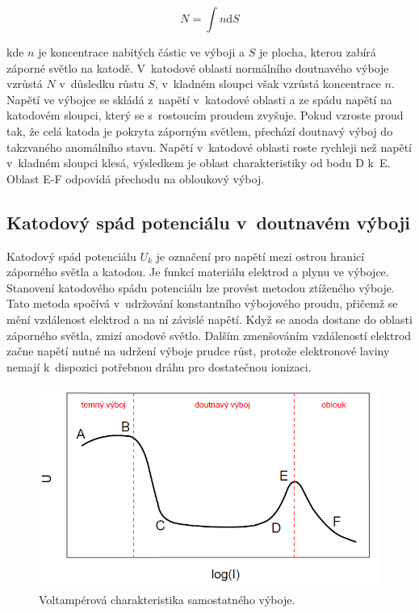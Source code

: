 \documentclass[a4paper,12pt]{article}
\begin{document}
\begin{equation}
	N = \int n \text{d}S
	\label{10}
\end{equation}

kde $n$ je koncentrace nabitých částic ve výboji a $S$ je plocha, kterou zabírá záporné světlo na katodě. V~katodové oblasti normálního doutnavého výboje vzrůstá $N$ v~důsledku růstu $S$, v~kladném sloupci však vzrůstá koncentrace $n$. Napětí ve výbojce se skládá z~napětí v~katodové oblasti a ze spádu napětí na katodovém sloupci, který se s~rostoucím proudem zvyšuje. Pokud vzroste proud tak, že celá katoda je pokryta záporným světlem, přechází doutnavý výboj do takzvaného anomálního stavu. Napětí v~katodové oblasti roste rychleji než napětí v~kladném sloupci klesá, výsledkem je oblast charakteristiky od bodu D k~E. Oblast E-F odpovídá přechodu na obloukový výboj.

\subsection{Katodový spád potenciálu v~doutnavém výboji}
Katodový spád potenciálu $U_k$ je označení pro napětí mezi ostrou hranicí záporného světla a katodou. Je funkcí materiálu elektrod a plynu ve výbojce. Stanovení katodového spádu potenciálu lze provést metodou ztíženého výboje. 
Tato metoda spočívá v~udržování konstantního výbojového proudu, přičemž se mění vzdálenost elektrod a na ní závislé napětí. Když se anoda dostane do oblasti záporného světla, zmizí anodové 
světlo. Dalším zmen\-šo\-vá\-ním vzdáleností elektrod začne napětí nutné na 
udržení výboje prudce růst, protože elektronové laviny nemají k~dispozici 
potřebnou dráhu pro dostatečnou ionizaci.

\begin{figure}[h]
	\centering
	\includegraphics[width=130mm]{VA.png}
	\caption{Voltampérová charakteristika samostatného výboje.}
	\label{VA}
\end{figure}
\end{document}
